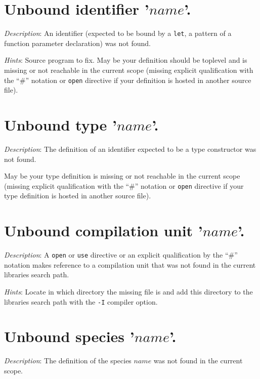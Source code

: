 \section*{Unbound identifier '$name$'.}
{\em Description}: An identifier (expected to be bound by a {\tt let},
a pattern of a function parameter declaration) was not found.

{\em Hints}: Source program to fix. May be your definition should be
toplevel and is missing or not reachable in the current scope (missing
explicit qualification with the ``\#'' notation or {\tt open}
directive if your definition is hosted in another source file).



\section*{Unbound type '$name$'.}
{\em Description}: The definition of an identifier expected to be a
type constructor was not found.

May be your type definition is missing or not reachable in the current
scope (missing explicit qualification with the ``\#'' notation or
{\tt open} directive if your type definition is hosted in another
source file).



\section*{Unbound compilation unit '$name$'.}  {\em Description}: A
{\tt open} or {\tt use} directive or an explicit qualification by the
``\#'' notation makes reference to a compilation unit that was not
found in the current libraries search path.

{\em Hints}: Locate in which directory the missing  file is
and add this directory to the libraries search path with the {\tt -I}
compiler option.



\section*{Unbound species '$name$'.}
{\em Description}: The definition of the species $name$ was not found
in the current scope.


